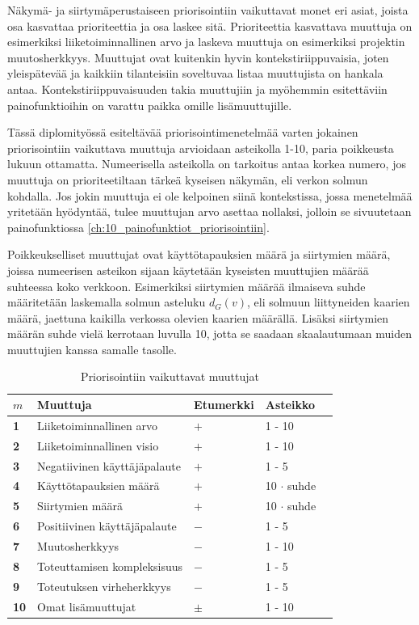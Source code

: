   Näkymä- ja siirtymäperustaiseen priorisointiin vaikuttavat monet eri asiat, joista osa kasvattaa prioriteettia ja osa laskee sitä.
  Prioriteettia kasvattava muuttuja on esimerkiksi liiketoiminnallinen arvo ja laskeva muuttuja on esimerkiksi projektin muutosherkkyys.
  Muuttujat ovat kuitenkin hyvin kontekstiriippuvaisia, joten yleispätevää ja kaikkiin tilanteisiin soveltuvaa listaa muuttujista on hankala antaa.
  Kontekstiriippuvaisuuden takia muuttujiin ja myöhemmin esitettäviin painofunktioihin on varattu paikka omille lisämuuttujille.

  Tässä diplomityössä esiteltävää priorisointimenetelmää varten jokainen priorisointiin vaikuttava muuttuja arvioidaan asteikolla 1-10, paria poikkeusta lukuun ottamatta.
  Numeerisella asteikolla on tarkoitus antaa korkea numero, jos muuttuja on prioriteetiltaan tärkeä kyseisen näkymän, eli verkon solmun kohdalla.
  Jos jokin muuttuja ei ole kelpoinen siinä kontekstissa, jossa menetelmää yritetään hyödyntää, tulee muuttujan arvo asettaa nollaksi, jolloin se sivuutetaan painofunktiossa \ref{ch:10_painofunktiot_priorisointiin}.

  Poikkeukselliset muuttujat ovat käyttötapauksien määrä ja siirtymien määrä, joissa numeerisen asteikon sijaan käytetään kyseisten muuttujien määrää suhteessa koko verkkoon.
  Esimerkiksi siirtymien määrää ilmaiseva suhde määritetään laskemalla solmun asteluku \(d_G(v)\), eli solmuun liittyneiden kaarien määrä, jaettuna kaikilla verkossa olevien kaarien määrällä.
  Lisäksi siirtymien määrän suhde vielä kerrotaan luvulla 10, jotta se saadaan skaalautumaan muiden muuttujien kanssa samalle tasolle.

  \begin{table}[H]
    \caption{Priorisointiin vaikuttavat muuttujat}
    \label{tab:priorisointiin_vaikuttavat_muuttujat}
    \centering
    \begin{tabular}{lllll} \hline
    \(m\) & \textbf{Muuttuja} & \textbf{Etumerkki} & \textbf{Asteikko} &  \\ \hline
    \textbf{1} & Liiketoiminnallinen arvo & \(+\) & 1 - 10 &  \\
    \textbf{2} & Liiketoiminnallinen visio & \(+\) & 1 - 10 &  \\
    \textbf{3} & Negatiivinen käyttäjäpalaute & \(+\) & 1 - 5 &  \\
    \textbf{4} & Käyttötapauksien määrä & \(+\) & 10 \(\cdot\) suhde &  \\
    \textbf{5} & Siirtymien määrä & \(+\) & 10 \(\cdot\) suhde &  \\
    \textbf{6} & Positiivinen käyttäjäpalaute & \(-\) & 1 - 5 &  \\
    \textbf{7} & Muutosherkkyys & \(-\) & 1 - 10 &  \\
    \textbf{8} & Toteuttamisen kompleksisuus & \(-\) & 1 - 5 &  \\
    \textbf{9} & Toteutuksen virheherkkyys & \(-\) & 1 - 5 &  \\
    \textbf{10} & Omat lisämuuttujat & \(\pm\) & 1 - 10 & \\ \hline
    \end{tabular}
  \end{table}

